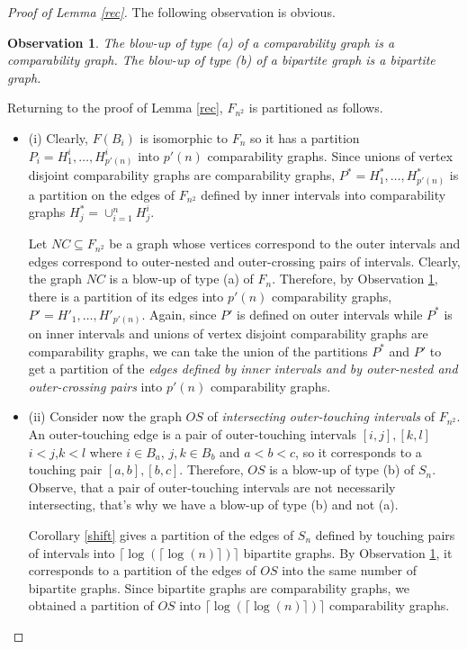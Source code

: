 \documentclass[12pt]{article}
\newtheorem{observation}[theorem]{Observation}
\begin{document}
\begin{proof}[Proof of Lemma \ref{rec}]
The following observation is obvious.

\begin{observation}\label{blow}
  The blow-up of type (a) of a comparability graph is a comparability graph.
    The blow-up of type (b) of a bipartite graph is a bipartite graph.
\end{observation}

Returning to the proof of Lemma \ref{rec}, $F_{n^2}$ is partitioned as follows.


\begin{itemize}

\item (i)  Clearly, $F(B_i)$ is isomorphic to $F_n$ so it has a partition
  $P_i= H^i_1, \ldots, H^i_{p'(n)}$ into $p'(n)$ comparability graphs. Since unions of vertex
  disjoint comparability graphs are comparability graphs,
  $P^*= H^*_1, \ldots, H^*_{p'(n)}$
is a partition on the edges of $F_{n^2}$ defined by
inner intervals into comparability graphs $H^*_j=\cup_{i=1}^nH^i_j$.

Let $NC\subseteq F_{n^2}$ be a graph whose vertices correspond to the outer intervals and edges
  correspond to outer-nested and
  outer-crossing pairs of intervals.
  Clearly, the graph $NC$ is a blow-up of type (a) of $F_n$. Therefore, by Observation \ref{blow}, there is a partition
  of its edges into $p'(n)$ comparability graphs,
 $P'=H'_1,\dots,H'_{p'(n)}$.
Again, since  $P'$ is defined on
outer intervals while $P^*$ is on inner intervals and
   unions of vertex
   disjoint comparability graphs are comparability graphs, we can take the union of the partitions
   $P^*$ and $P'$ to get
   a partition of the {\em edges defined by inner intervals and by outer-nested and outer-crossing pairs} into
   $p'(n)$ comparability graphs.


 \item (ii) Consider now the graph $OS$ of {\em intersecting outer-touching intervals} of $F_{n^2}$.
   An outer-touching edge is a pair of outer-touching intervals $[i,j], [k,l]$ $i<j$,$k<l$ where
   $i\in B_a$, $j, k\in B_b$ and $a<b<c$, so it corresponds to a touching pair $[a, b], [b, c]$. Therefore,
   $OS$ is a blow-up of type (b) of $S_n$. Observe, that a pair of outer-touching intervals are not necessarily intersecting,
   that's why we have a blow-up of type (b) and not (a).



   Corollary \ref{shift} gives a partition of the edges of $S_n$ defined by touching pairs of intervals
   into $\lceil\log(\lceil\log(n)\rceil)\rceil$ bipartite graphs.
   By Observation \ref{blow}, it corresponds to a partition of the edges of $OS$
   into the same number of bipartite graphs. Since bipartite graphs are comparability graphs, we
   obtained a partition of $OS$ into  $\lceil\log(\lceil\log(n)\rceil)\rceil$ comparability graphs.


\end{itemize}
\end{proof}
\end{document}

